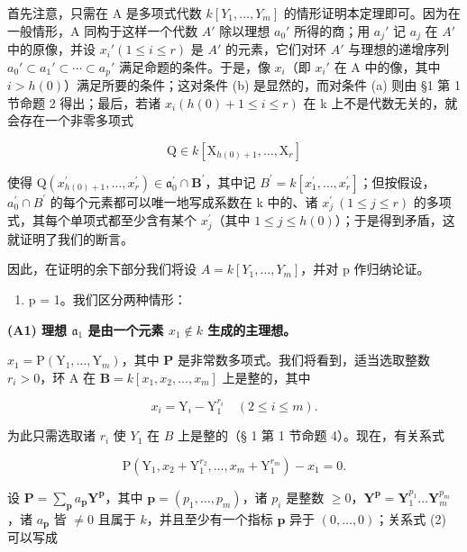 首先注意，只需在 A 是多项式代数 \(k[Y_{1},\ldots,Y_{m}]\) 的情形证明本定理即可。因为在一般情形，A 同构于这样一个代数 \(A'\) 除以理想 \(a_{0}'\) 所得的商；用 \(a_{j}'\) 记 \(a_{j}\) 在 \(A'\) 中的原像，并设 \(x_{i}'(1\leqslant i\leqslant r)\) 是 \(A'\) 的元素，它们对环 \(A'\) 与理想的递增序列 \(a_{0}'\subset a_{1}'\subset\cdots\subset a_{p}'\) 满足命题的条件。于是，像 \(x_{i}\)（即 \(x_{i}'\) 在 A 中的像，其中 \(i>h(0)\)）满足所要的条件；这对条件 (b) 是显然的，而对条件 (a) 则由 §1 第 1 节命题 2 得出；最后，若诸 \(x_{i}(h(0)+1\leqslant i\leqslant r)\) 在 k 上不是代数无关的，就会存在一个非零多项式

\[
\mathrm{Q} \in k [ \mathrm{X} _ {h (0) + 1}, \dots , \mathrm{X} _ {r} ]
\]

使得 \(\mathrm{Q}(x_{h(0)+1}^{\prime},\ldots,x_{r}^{\prime})\in\mathfrak{a}_{0}^{\prime}\cap\mathbf{B}^{\prime}\)，其中记 \(B^{\prime}=k[x_{1}^{\prime},\ldots,x_{r}^{\prime}]\)；但按假设，\(a_{0}^{\prime}\cap B^{\prime}\) 的每个元素都可以唯一地写成系数在 k 中的、诸 \(x_{j}^{\prime}\ (1\leqslant j\leqslant r)\) 的多项式，其每个单项式都至少含有某个 \(x_{j}^{\prime}\)（其中 \(1\leqslant j\leqslant h(0)\)）；于是得到矛盾，这就证明了我们的断言。

因此，在证明的余下部分我们将设 \(A = k[Y_{1}, \ldots, Y_{m}]\)，并对 p 作归纳论证。

\begin{enumerate}
\def\labelenumi{(\Alph{enumi})}
\tightlist
\item
  p = 1。我们区分两种情形：
\end{enumerate}

\textbf{(A1) 理想 \(\mathfrak{a}_1\) 是由一个元素 \(x_1 \notin k\) 生成的主理想。}\par

\(x_{1} = \mathrm{P}(\mathrm{Y}_{1},\ldots ,\mathrm{Y}_{m})\)，其中 \(\mathbf{P}\) 是非常数多项式。我们将看到，适当选取整数 \(r_i > 0\)，环 A 在 \(\mathbf{B} = k[x_1,x_2,\dots ,x_m]\) 上是整的，其中

\[
x _ {i} = \mathrm{Y} _ {i} - \mathrm{Y} _ {1} ^ {r _ {i}} \quad (2 \leqslant i \leqslant m).\tag{1}
\]

为此只需选取诸 \(r_i\) 使 \(Y_1\) 在 \(B\) 上是整的（§ 1 第 1 节命题 4）。现在，有关系式

\[
\mathrm{P} \left(\mathrm{Y} _ {1}, x _ {2} + \mathrm{Y} _ {1} ^ {r _ {2}}, \dots , x _ {m} + \mathrm{Y} _ {1} ^ {r _ {m}}\right) - x _ {1} = 0.\tag{2}
\]

设 \(\mathbf{P} = \sum_{\mathbf{p}} a_{\mathbf{p}} \mathbf{Y}^{\mathbf{p}}\)，其中 \(\mathbf{p} = (p_1, \ldots, p_m)\)，诸 \(p_i\) 是整数 \(\geqslant 0\)，\(\mathbf{Y}^{\mathbf{p}} = \mathbf{Y}_1^{p_1} \ldots \mathbf{Y}_m^{p_m}\)，诸 \(a_{\mathbf{p}}\) 皆 \(\neq 0\) 且属于 \(k\)，并且至少有一个指标 \(\mathbf{p}\) 异于 \((0, \ldots, 0)\)；关系式 (2) 可以写成

